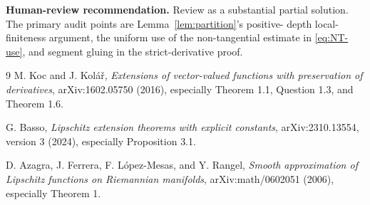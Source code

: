 \documentclass[11pt]{article}
\begin{document}
\textbf{Human-review recommendation.}  Review as a substantial partial
solution.  The primary audit points are Lemma~\ref{lem:partition}'s positive-
depth local-finiteness argument, the uniform use of the non-tangential estimate
in \eqref{eq:NT-use}, and segment gluing in the strict-derivative proof.

\begin{thebibliography}{9}
M. Koc and J. Kol\'a\v r,
\emph{Extensions of vector-valued functions with preservation of derivatives},
arXiv:1602.05750 (2016), especially Theorem 1.1, Question 1.3, and
Theorem 1.6.

G. Basso,
\emph{Lipschitz extension theorems with explicit constants},
arXiv:2310.13554, version 3 (2024), especially Proposition 3.1.

D. Azagra, J. Ferrera, F. L\'opez-Mesas, and Y. Rangel,
\emph{Smooth approximation of Lipschitz functions on Riemannian manifolds},
arXiv:math/0602051 (2006), especially Theorem 1.
\end{thebibliography}
\end{document}
